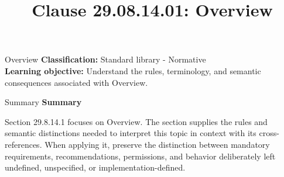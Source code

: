 \documentclass[10pt,letterpaper]{article}
\title{Clause 29.08.14.01: Overview}
\author{}
\date{}
\begin{document}
\maketitle
\begin{CornellOverviewBox}{Overview}
\textbf{Classification:} Standard library - Normative\\[2pt]
\textbf{Learning objective:} Understand the rules, terminology, and semantic consequences associated with Overview.
\end{CornellOverviewBox}\begin{CornellSummaryBox}{Summary}
{\sffamily\bfseries\color{Accent} Summary}\par\vspace{3pt}Section 29.8.14.1 focuses on Overview. The section supplies the rules and semantic distinctions needed to interpret this topic in context with its cross-references. When applying it, preserve the distinction between mandatory requirements, recommendations, permissions, and behavior deliberately left undefined, unspecified, or implementation-defined.
\end{CornellSummaryBox}
\end{document}
